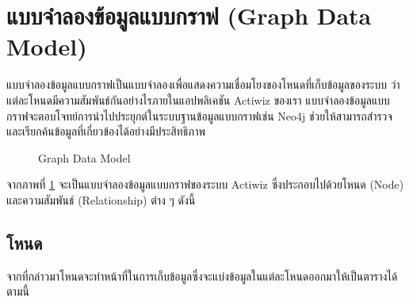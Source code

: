 \documentclass[14pt,oneside,openright,a4paper]{cpe-thai-project}
\begin{document}
\section{แบบจำลองข้อมูลแบบกราฟ (Graph Data Model)}
แบบจำลองข้อมูลแบบกราฟเป็นแบบจำลองเพื่อแสดงความเชื่อมโยงของโหนดที่เก็บข้อมูลของระบบ ว่าแต่ละโหนดมีความสัมพันธ์กันอย่างไรภายในแอปพลิเคชัน Actiwiz ของเรา แบบจำลองข้อมูลแบบกราฟจะตอบโจทย์การนำไปประยุกต์ในระบบฐานข้อมูลแบบกราฟเช่น Neo4j ช่วยให้สามารถสำรวจและเรียกค้นข้อมูลที่เกี่ยวข้องได้อย่างมีประสิทธิภาพ
  \begin{figure}[!h]\centering
    \setlength{\fboxrule}{0.5mm} %
    \setlength{\fboxsep}{0.5cm}
    \caption{Graph Data Model}\label{fig:Graph Data Model}
  \end{figure}
  \FloatBarrier
จากภาพที่ \ref{fig:Graph Data Model} จะเป็นแบบจำลองข้อมูลแบบกราฟของระบบ Actiwiz ซึ่งประกอบไปด้วยโหนด (Node) และความสัมพันธ์ (Relationship) ต่าง ๆ ดังนี้
\newpage
\subsection{โหนด}
    จากที่กล่าวมาโหนดจะทำหน้าที่ในการเก็บข้อมูลซึ่งจะแบ่งข้อมูลในแต่ละโหนดออกมาให้เป็นตารางได้ตามนี้
\end{document}

